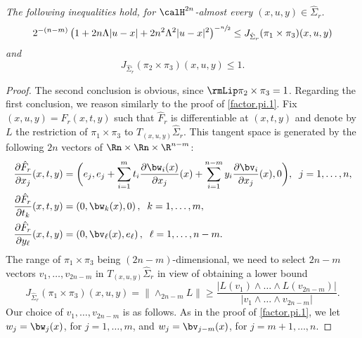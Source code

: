 \begin{Empty}
\label{factor}
{\it
The following inequalities hold, for $\calH^{2n}$-almost every $(x,u,y) \in \hat{\Sigma}_r$.
\begin{equation*}
2^{-(n-m)} \left(1 + 2n\Lambda |u-x| + 2n^2 \Lambda^2 |u-x|^2 \right)^{-\sfrac{n}{2}}
\leq J_{\hat{\Sigma}_r} (\pi_1 \times \pi_3)(x,u,y)
\end{equation*}
and
\begin{equation*}
J_{\hat{\Sigma}_r} (\pi_2 \times \pi_3)(x,u,y) \leq 1.
\end{equation*}
}
\end{Empty}

\begin{proof}
The second conclusion is obvious, since $\rmLip \pi_2 \times \pi_3 = 1$.
Regarding the first conclusion, we reason similarly to the proof of \ref{factor.pi.1}.
Fix $(x,u,y) = \hat{F}_r(x,t,y)$ such that $\hat{F}_r$ is differentiable at $(x,t,y)$ and denote by $L$ the restriction of $\pi_1 \times \pi_3$ to $T_{(x,u,y)}\hat{\Sigma}_r$.
This tangent space is generated by the following $2n$ vectors of $\Rn \times \Rn \times \R^{n-m}$:
\begin{equation*}
\begin{split}
\frac{\partial \hat{F}_r}{\partial x_j}(x,t,y) & = \biggl(e_j, e_j + \sum_{i=1}^m t_i \dfrac{\partial \bw_i(x)}{\partial x_j}(x) + \sum_{i=1}^{n-m} y_i \dfrac{\partial \bv_i}{\partial x_j}(x), 0 \biggr),\;\; j=1,\ldots,n, \\
\frac{\partial \hat{F}_r}{\partial t_k}(x,t,y) & =\left(0, \bw_k(x), 0 \right),\;\; k=1,\ldots,m, \\
\frac{\partial \hat{F}_r}{\partial y_\ell}(x,t,y) & = \left(0, \bv_\ell(x), e_\ell \right),\;\; \ell=1,\ldots,n-m.
\end{split}
\end{equation*}
The range of $\pi_1 \times \pi_3$ being $(2n -m)$-dimensional, we need to select $2n-m$ vectors $v_1,\ldots,v_{2n-m}$ in $ T_{(x,u,y)}\hat{\Sigma}_r$ in view of obtaining a lower bound
\begin{equation}
\label{eq.22}
J_{\hat{\Sigma}_r} (\pi_1 \times \pi_3)(x,u,y) = \|{\wedge}_{2n-m} L \| \geq \frac{|L(v_1) \wedge \ldots \wedge L(v_{2n-m})|}{|v_1 \wedge \ldots \wedge v_{2n-m}|}.
\end{equation}
Our choice of $v_1,\ldots,v_{2n-m}$ is as follows.
As in the proof of \ref{factor.pi.1}, we let $w_j=\bw_j(x)$, for $j=1,\ldots,m$, and $w_j=\bv_{j-m}(x)$, for $j=m+1,\ldots,n$.

\end{proof}
